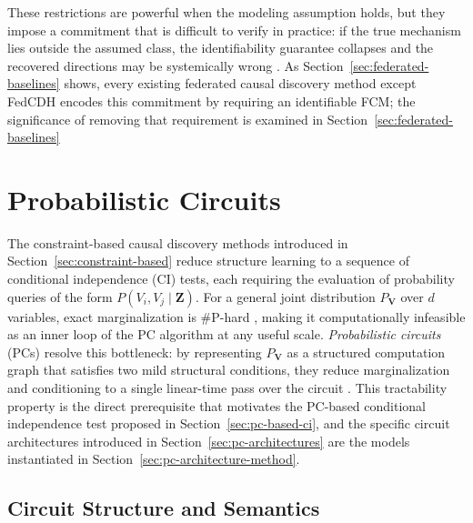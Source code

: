 These restrictions are powerful when the modeling assumption holds, but they impose a commitment that is difficult to verify in practice: if the true mechanism lies outside the assumed class, the identifiability guarantee collapses and the recovered directions may be systemically wrong \cite{Peters2017ElementsOC}.
As Section~\ref{sec:federated-baselines} shows, every existing federated causal discovery method except FedCDH encodes this commitment by requiring an identifiable FCM; the significance of removing that requirement is examined in Section~\ref{sec:federated-baselines}

\section{Probabilistic Circuits}\label{sec:pcs}

The constraint-based causal discovery methods introduced in Section~\ref{sec:constraint-based} reduce structure learning to a sequence of conditional independence (CI) tests, each requiring the evaluation of probability queries of the form $P(V_i, V_j \mid \mathbf{Z})$.
For a general joint distribution $P_{\mathbf{V}}$ over $d$ variables, exact marginalization is \#P-hard \cite{Cooper1990TheCC}, making it computationally infeasible as an inner loop of the PC algorithm at any useful scale.
\emph{Probabilistic circuits} (PCs) resolve this bottleneck: by representing $P_{\mathbf{V}}$ as a structured computation graph that satisfies two mild structural conditions, they reduce marginalization and conditioning to a single linear-time pass over the circuit \cite{Poon2011SumproductNA, Darwiche2000ADA}.
This tractability property is the direct prerequisite that motivates the PC-based conditional independence test proposed in Section~\ref{sec:pc-based-ci}, and the specific circuit architectures introduced in Section~\ref{sec:pc-architectures} are the models instantiated in Section~\ref{sec:pc-architecture-method}.

\subsection*{Circuit Structure and Semantics}\label{sec:pc-structure}

